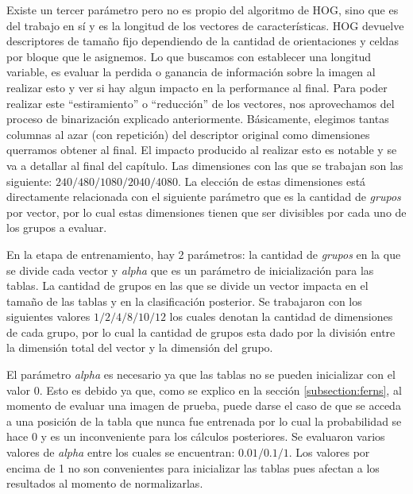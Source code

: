 	Existe un tercer parámetro pero no es propio del algoritmo de HOG, sino que es del trabajo en sí y es la longitud de los vectores de características. HOG devuelve descriptores de tamaño fijo dependiendo de la cantidad de orientaciones y celdas por bloque que le asignemos. Lo que buscamos con establecer una longitud variable, es evaluar la perdida o ganancia de información sobre la imagen al realizar esto y ver si hay algun impacto en la performance al final. Para poder realizar este ``estiramiento'' o ``reducción'' de los vectores, nos aprovechamos del proceso de binarización explicado anteriormente. Básicamente, elegimos tantas columnas al azar (con repetición) del descriptor original como dimensiones querramos obtener al final. El impacto producido al realizar esto es notable y se va a detallar al final del capítulo. Las dimensiones con las que se trabajan son las siguiente: $240/480/1080/2040/4080$. La elección de estas dimensiones está directamente relacionada con el siguiente parámetro que es la cantidad de \textit{grupos} por vector, por lo cual estas dimensiones tienen que ser divisibles por cada uno de los grupos a evaluar.
	
	En la etapa de entrenamiento, hay 2 parámetros: la cantidad de \textit{grupos} en la que se divide cada vector y \textit{alpha} que es un parámetro de inicialización para las tablas. La cantidad de grupos en las que se divide un vector impacta en el tamaño de las tablas y en la clasificación posterior. Se trabajaron con los siguientes valores $1/2/4/8/10/12$ los cuales denotan la cantidad de dimensiones de cada grupo, por lo cual  la cantidad de grupos esta dado por la división entre la dimensión total del vector y la dimensión del grupo.
	
	El parámetro \textit{alpha} es necesario ya que las tablas no se pueden inicializar con el valor $0$. Esto es debido ya que, como se explico en la sección \ref{subsection:ferns}, al momento de evaluar una imagen de prueba, puede darse el caso de que se acceda a una posición de la tabla que nunca fue entrenada por lo cual la probabilidad se hace 0 y es un inconveniente para los cálculos posteriores. Se evaluaron varios valores de \textit{alpha} entre los cuales se encuentran: $0.01/0.1/1$. Los valores por encima de 1 no son convenientes para inicializar las tablas pues afectan a los resultados al momento de normalizarlas.
	
	
	